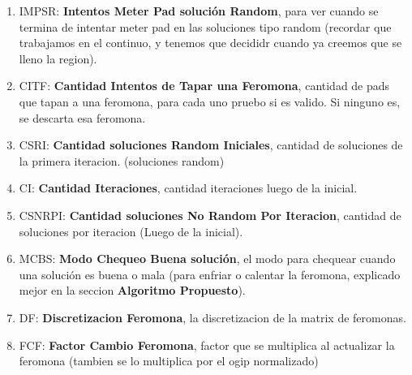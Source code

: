 \begin{enumerate}
\item IMPSR: \textbf{Intentos Meter Pad soluci\'on Random}, para ver cuando se termina de intentar meter pad en las soluciones tipo random (recordar que trabajamos en el continuo, y tenemos que decididr cuando ya creemos que se lleno la region).
\item CITF:  \textbf{Cantidad Intentos de Tapar una Feromona}, cantidad de pads que tapan a una feromona, para cada uno pruebo si es valido. Si ninguno es, se descarta esa feromona.
\item CSRI: \textbf{Cantidad soluciones Random Iniciales}, cantidad de soluciones de la primera iteracion. (soluciones random)
\item CI: \textbf{Cantidad Iteraciones}, cantidad iteraciones luego de la inicial.
\item CSNRPI: \textbf{Cantidad soluciones No Random Por Iteracion}, cantidad de soluciones por iteracion (Luego de la inicial).
\item MCBS: \textbf{Modo Chequeo Buena soluci\'on}, el modo para chequear cuando una soluci\'on es buena o mala (para enfriar o calentar la feromona, explicado mejor en la seccion \textbf{Algoritmo Propuesto}).
\item DF: \textbf{Discretizacion Feromona}, la discretizacion de la matrix de feromonas.
\item FCF: \textbf{Factor Cambio Feromona}, factor que se multiplica al actualizar la feromona (tambien se lo multiplica por el ogip normalizado)
\end{enumerate}












